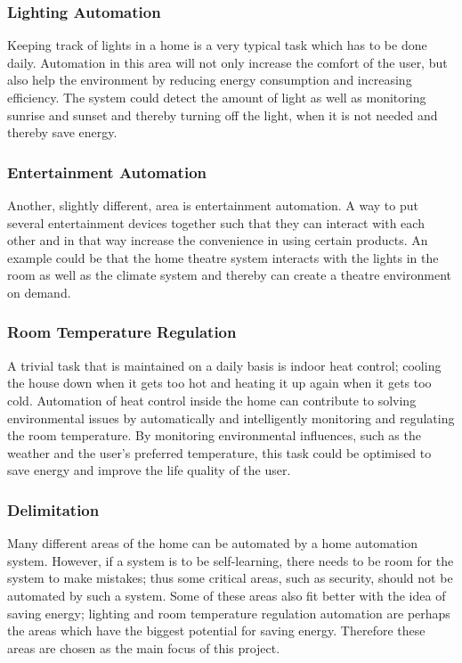 \subsubsection{Lighting Automation}
\label{sub:Lighting Automation}
Keeping track of lights in a home is a very typical task which has to be done daily. Automation in this area will not only increase the comfort of the user, but also help the environment by reducing energy consumption and increasing efficiency. The system could detect the amount of light as well as monitoring sunrise and sunset and thereby turning off the light, when it is not needed and thereby save energy.

\subsubsection{Entertainment Automation} 
\label{sub:Entertainment Automation}
Another, slightly different, area is entertainment automation. A way to put several entertainment devices together such that they can interact with each other and in that way increase the convenience in using certain products. An example could be that the home theatre system interacts with the lights in the room as well as the climate system and thereby can create a theatre environment on demand.

\subsubsection{Room Temperature Regulation}
\label{sub:Room Temperature Regulation}
A trivial task that is maintained on a daily basis is indoor heat control; cooling the house down when it gets too hot and heating it up again when it gets too cold. Automation of heat control inside the home can contribute to solving environmental issues by automatically and intelligently monitoring and regulating the room temperature. By monitoring environmental influences, such as the weather and the user's preferred temperature, this task could be optimised to save energy and improve the life quality of the user.

\subsubsection{Delimitation}
Many different areas of the home can be automated by a home automation system. However, if a system is to be self-learning, there needs to be room for the system to make mistakes; thus some critical areas, such as security, should not be automated by such a system. Some of these areas also fit better with the idea of saving energy; lighting and room temperature regulation automation are perhaps the areas which have the biggest potential for saving energy. Therefore these areas are chosen as the main focus of this project.
